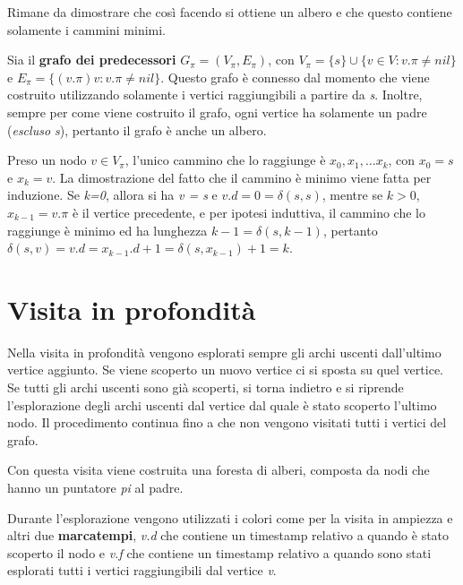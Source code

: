 Rimane da dimostrare che così facendo si ottiene un albero e che questo
contiene solamente i cammini minimi.

Sia il \textbf{grafo dei predecessori} $G_{\pi} = (V_{\pi}, E_{\pi})$, con
$V_{\pi} = \{s\} \cup \{v \in V : v.\pi \neq nil\}$ e $E_{\pi} = \{(v.\pi)v :
v.\pi \neq nil\}$. Questo grafo è connesso dal momento che viene costruito
utilizzando solamente i vertici raggiungibili a partire da \emph{s}.
Inoltre, sempre per come viene costruito il grafo, ogni vertice ha
solamente un padre (\emph{escluso s}), pertanto il grafo è anche un
albero.

Preso un nodo $v \in V_{\pi}$, l'unico cammino che lo raggiunge è
$x_0, x_1, \ldots x_k$, con $x_0 = s$ e $x_k = v$. La
dimostrazione del fatto che il cammino è minimo viene fatta per
induzione. Se \emph{k=0}, allora si ha \emph{v = s} e $v.d = 0 =
\delta(s,s)$, mentre se $k >0$, $x_{k-1} = v.\pi$ è il
vertice precedente, e per ipotesi induttiva, il cammino che lo raggiunge
è minimo ed ha lunghezza $k-1 = \delta(s,k-1)$, pertanto
$\delta(s,v) = v.d = x_{k-1}.d+1 = \delta(s,x_{k-1})+1 = k$.

\section{Visita in profondità}\label{visita-in-profondituxe0}

Nella visita in profondità vengono esplorati sempre gli archi uscenti
dall'ultimo vertice aggiunto. Se viene scoperto un nuovo vertice ci si
sposta su quel vertice. Se tutti gli archi uscenti sono già scoperti,
si torna indietro e si riprende l'esplorazione degli archi uscenti dal
vertice dal quale è stato scoperto l'ultimo nodo. Il procedimento
continua fino a che non vengono visitati tutti i vertici del grafo.

Con questa visita viene costruita una foresta di alberi, composta da
nodi che hanno un puntatore \emph{pi} al padre.

Durante l'esplorazione vengono utilizzati i colori come per la visita in
ampiezza e altri due \textbf{marcatempi}, \emph{v.d} che contiene un
timestamp relativo a quando è stato scoperto il nodo e \emph{v.f} che
contiene un timestamp relativo a quando sono stati esplorati tutti i
vertici raggiungibili dal vertice \emph{v}.


